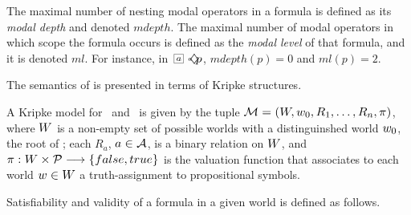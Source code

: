

The maximal number of nesting modal operators in a formula is defined as its \emph{modal depth} and denoted $mdepth$. The maximal number of modal operators in which scope the formula occurs is defined as the \emph{modal level} of that formula, and it is denoted $ml$. For instance, in $\nec{a}\pos{a} p$, $mdepth(p) = 0$ and $ml(p) = 2$.

The semantics of  is presented in terms of Kripke structures.

\begin{definition}
    A Kripke model for \Prop~and \Agents~is given by the tuple $\Model = (\St, \st_0, R_1, \ldots, R_n, \pi)$,
    where $\St$ is a non-empty set of possible worlds with a distinguinshed world
    $\st_0$, the root of \Model; each $R_a$, $a \in \Agents$, is a binary relation
    on $\St$, and $\pi: \St \times \Prop \longrightarrow \{false, true\}$ is the
    valuation function that associates to each world $\st \in \St$ a
    truth-assignment to propositional symbols.
\end{definition}

Satisfiability and validity of a formula in a given world is defined as follows.


